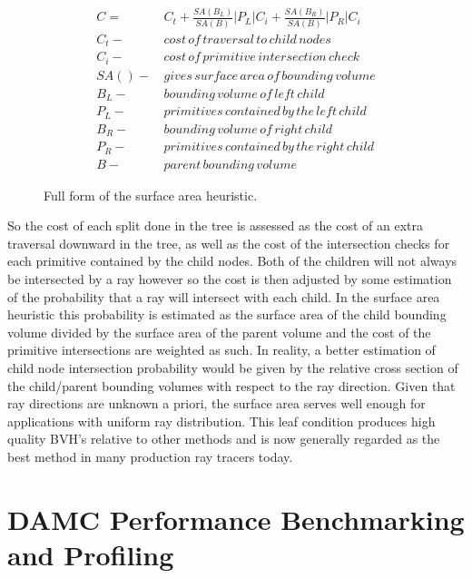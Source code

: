 \documentclass[10pt, a4paper]{article}
\begin{document}
\begin{figure}
  \caption{Full form of the surface area heuristic.}
  \label{SAH}
\begin{centering}
  \begin{align*}
    C = & \,C_{t} + \frac{SA(B_{L})}{SA(B)} |P_{L}|C_{i} +  \frac{SA(B_{R})}{SA(B)} |P_{R}|C_{i} \\ C_{t} - & \,cost\, of\, traversal\, to\, child\, nodes \\ C_{i} - & \, cost\, of\, primitive\, intersection\, check\, \\ SA() - & \, gives\, surface\, area\, of\, bounding\, volume \\ B_{L} - & \, bounding\, volume\, of\, left\, child \\ P_{L} - & \, primitives\, contained\, by\, the\, left\, child  \\ B_{R} - & \, bounding\, volume\, of\, right\, child \\ P_{R} - & \, primitives\, contained\, by\, the\, right\, child \\ B - & \, parent\, bounding\, volume
  \end{align*}
\end{centering}
\end{figure}

So the cost of each split done in the tree is assessed as the cost of an extra traversal downward in the tree, as well as the cost of the intersection checks for each primitive contained by the child nodes. Both of the children will not always be intersected by a ray however so the cost is then adjusted by some estimation of the probability that a ray will intersect with each child. In the surface area heuristic this probability is estimated as the surface area of the child bounding volume divided by the surface area of the parent volume and the cost of the primitive intersections are weighted as such. In reality, a better estimation of  child node intersection probability would be given by the relative cross section of the child/parent bounding volumes with respect to the ray direction. Given that ray directions are unknown a priori, the surface area serves well enough for applications with uniform ray distribution. This leaf condition produces high quality BVH's relative to other methods and is now generally regarded as the best method in many production ray tracers today. 

\section{DAMC Performance Benchmarking and Profiling}%
\end{document}
